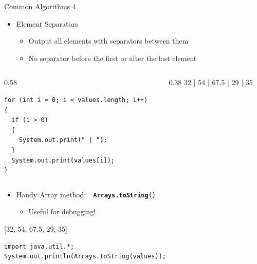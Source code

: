 \documentclass[aspectratio=43,10pt,t]{beamer}
\newcommand{\code}[1]{\texttt{#1}}
\begin{document}
\begin{frame}[fragile]{Common Algorithms 4}
  \begin{itemize}
    \item Element Separators
      \begin{itemize}
        \item Output all elements with separators between them
        \item No separator before the first or after the last element
      \end{itemize}
  \end{itemize}
  \begin{columns}[c]
    \begin{column}{0.58\textwidth}
\begin{lstlisting}
for (int i = 0; i < values.length; i++)
{
  if (i > 0)
  {
    System.out.print(" | ");
  }
  System.out.print(values[i]);
}
\end{lstlisting}
    \end{column}
    \begin{column}{0.38\textwidth}
      {\setlength{\fboxsep}{3pt}\colorbox{progbg}{\ttfamily\footnotesize 32 | 54 | 67.5 | 29 | 35}}
    \end{column}
  \end{columns}
  \begin{itemize}
    \item Handy Array method:\ \ \textbf{\code{Arrays.toString}}\code{()}
      \begin{itemize}
        \item Useful for debugging!
      \end{itemize}
  \end{itemize}
  \hfill{\setlength{\fboxsep}{3pt}\colorbox{progbg}{\ttfamily\footnotesize [32, 54, 67.5, 29, 35]}}\hspace*{6mm}
\begin{lstlisting}[linewidth=0.7\linewidth,xleftmargin=0.12\linewidth]
import java.util.*;
System.out.println(Arrays.toString(values));
\end{lstlisting}
\end{frame}
\end{document}

